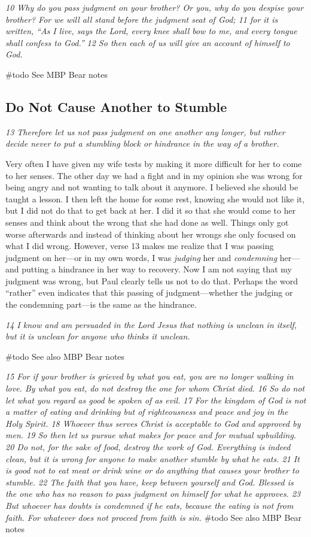 \emph{10 Why do you pass judgment on your brother? Or you, why do you
despise your brother? For we will all stand before the judgment seat of
God; 11 for it is written,} \emph{``As I live, says the Lord, every knee
shall bow to me, and every tongue shall confess to God.''}
\emph{12 So then each of us will give an account of himself to God.}

\#todo See MBP Bear notes

\subsection{Do Not Cause Another to Stumble} \emph{13 Therefore let us not
pass judgment on one another any longer, but rather decide never to put
a stumbling block or hindrance in the way of a brother.}

Very often I have given my wife tests by making it more difficult for
her to come to her senses. The other day we had a fight and in my
opinion she was wrong for being angry and not wanting to talk about it
anymore. I believed she should be taught a lesson. I then left the home
for some rest, knowing she would not like it, but I did not do that to
get back at her. I did it so that she would come to her senses and think
about the wrong that she had done as well. Things only got worse
afterwards and instead of thinking about her wrongs she only focused on
what I did wrong. However, verse 13 makes me realize that I was passing
judgment on her---or in my own words, I was \emph{judging} her and
\emph{condemning} her---and putting a hindrance in her way to recovery.
Now I am not saying that my judgment was wrong, but Paul clearly tells
us not to do that. Perhaps the word ``rather'' even indicates that this
passing of judgment---whether the judging or the condemning part---is
the same as the hindrance.

\emph{14 I know and am persuaded in the Lord Jesus that nothing is
unclean in itself, but it is unclean for anyone who thinks it unclean.}

\#todo See also MBP Bear notes

\emph{15 For if your brother is grieved by what you eat, you are no
longer walking in love. By what you eat, do not destroy the one for whom
Christ died. 16 So do not let what you regard as good be spoken of as
evil. 17 For the kingdom of God is not a matter of eating and drinking
but of righteousness and peace and joy in the Holy Spirit. 18 Whoever
thus serves Christ is acceptable to God and approved by men. 19 So then
let us pursue what makes for peace and for mutual upbuilding.} \emph{20
Do not, for the sake of food, destroy the work of God. Everything is
indeed clean, but it is wrong for anyone to make another stumble by what
he eats. 21 It is good not to eat meat or drink wine or do anything that
causes your brother to stumble. 22 The faith that you have, keep between
yourself and God. Blessed is the one who has no reason to pass judgment
on himself for what he approves. 23 But whoever has doubts is condemned
if he eats, because the eating is not from faith. For whatever does not
proceed from faith is sin.} \#todo See also MBP Bear notes



